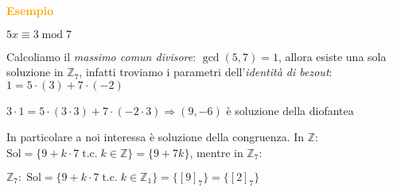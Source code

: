 \begin{boxA}
    \textcolor{orange}{\textbf{Esempio}}

    {\centering
        $5x \equiv 3 \; \text{mod} \; 7$
    \par}
    Calcoliamo il \textit{massimo comun divisore}: $\gcd (5, 7) = 1$, allora esiste una sola soluzione in $\mathbb{Z}_7$, infatti troviamo i parametri dell'\textit{identità di bezout}: $1 = 5 \cdot (3) + 7 \cdot (-2)$

    {\centering
        $3 \cdot 1 = 5 \cdot (3 \cdot 3) + 7 \cdot (-2 \cdot 3) \Rightarrow (9, -6)$ è soluzione della diofantea
    \par}
    In particolare a noi interessa  è soluzione della congruenza. In $\mathbb{Z}$: $\text{Sol} = \{9 + k \cdot 7 \; \text{t.c.} \; k \in \mathbb{Z}\} = \{9 + 7k\}$, mentre in $\mathbb{Z}_7$:

    {\centering
        $\mathbb{Z}_7: \; \text{Sol} = \{9 + k \cdot 7 \; \text{t.c.} \; k \in \mathbb{Z}_1\} = \{[9]_7\} = \{[2]_7\}$
    \par}
\end{boxA}